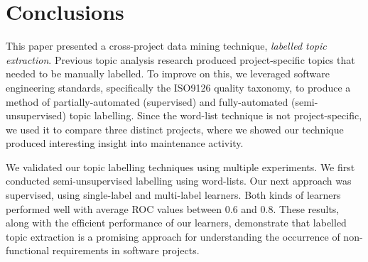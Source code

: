 \documentclass[smallextended]{svjour3}       %
\begin{document}
\section{Conclusions}
This paper presented a cross-project data mining technique,
\emph{labelled topic extraction}. %
Previous topic analysis research produced project-specific
topics that needed to be manually labelled.
To improve on this, we leveraged software engineering standards,
specifically the ISO9126 quality taxonomy, to produce a method of partially-automated (supervised) and fully-automated (semi-unsupervised) topic labelling.
Since the word-list technique is not project-specific, we used it to compare three distinct projects, where we showed our technique produced interesting
insight into maintenance activity. %


We validated our topic labelling techniques using multiple experiments. %
We first conducted semi-unsupervised labelling using word-lists. 
Our next approach was supervised, using single-label and multi-label learners. 
Both kinds of learners performed well with average
ROC values between $0.6$ and $0.8$. These results, along with the efficient performance of our learners, demonstrate that labelled topic extraction is
a promising approach for understanding the occurrence of non-functional requirements in software projects. 
\end{document}
